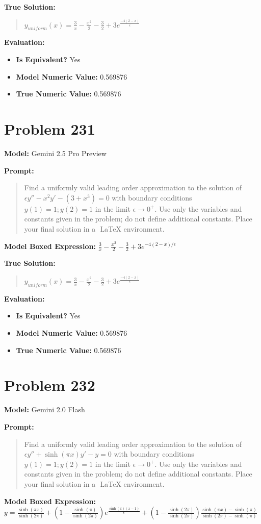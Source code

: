\documentclass{article}
\begin{document}
{\textbf{True Solution:}
\begin{quote}
$y_{uniform}(x) = \frac{3}{x} -\frac{x^2}{2} -\frac{3}{2} + 3e^{\frac{-4(2-x)}{\epsilon}}$
\end{quote}

\textbf{Evaluation:}
\begin{itemize}
\item \textbf{Is Equivalent?} Yes
\item \textbf{Model Numeric Value:} 0.569876
\item \textbf{True Numeric Value:} 0.569876
\end{itemize}
\vspace{1cm}
\section*{Problem 231}
\textbf{Model:} Gemini 2.5 Pro Preview

\textbf{Prompt:}
\begin{quote}
Find a uniformly valid leading order approximation to the solution of $\epsilon y'' - x^2y' - (3+x^3) = 0$ with boundary conditions $y(1) = 1; y(2) = 1$ in the limit $\epsilon \to 0^+$. Use only the variables and constants given in the problem; do not define additional constants. Place your final solution in a $\boxed{}$ LaTeX environment.
\end{quote}
\textbf{Model Boxed Expression:} $\frac{3}{x} - \frac{x^2}{2} - \frac{3}{2} + 3e^{-4(2-x)/\epsilon}$

\textbf{True Solution:}
\begin{quote}
$y_{uniform}(x) = \frac{3}{x} -\frac{x^2}{2} -\frac{3}{2} + 3e^{\frac{-4(2-x)}{\epsilon}}$
\end{quote}

\textbf{Evaluation:}
\begin{itemize}
\item \textbf{Is Equivalent?} Yes
\item \textbf{Model Numeric Value:} 0.569876
\item \textbf{True Numeric Value:} 0.569876
\end{itemize}
\vspace{1cm}
\section*{Problem 232}
\textbf{Model:} Gemini 2.0 Flash

\textbf{Prompt:}
\begin{quote}
Find a uniformly valid leading order approximation to the solution of $\epsilon y'' + \sinh(\pi x)y' - y = 0$ with boundary conditions $y(1) = 1; y(2) = 1$ in the limit $\epsilon \to 0^+$. Use only the variables and constants given in the problem; do not define additional constants. Place your final solution in a $\boxed{}$ LaTeX environment.
\end{quote}
\textbf{Model Boxed Expression:} $y = \frac{\sinh(\pi x)}{\sinh(2\pi)} + \left(1 - \frac{\sinh(\pi)}{\sinh(2\pi)}\right)e^{\frac{\sinh(\pi)(x-1)}{\epsilon}} + \left(1 - \frac{\sinh(2\pi)}{\sinh(2\pi)}\right)\frac{\sinh(\pi x)-\sinh(\pi)}{\sinh(2\pi)-\sinh(\pi)}$

}
\end{document}
